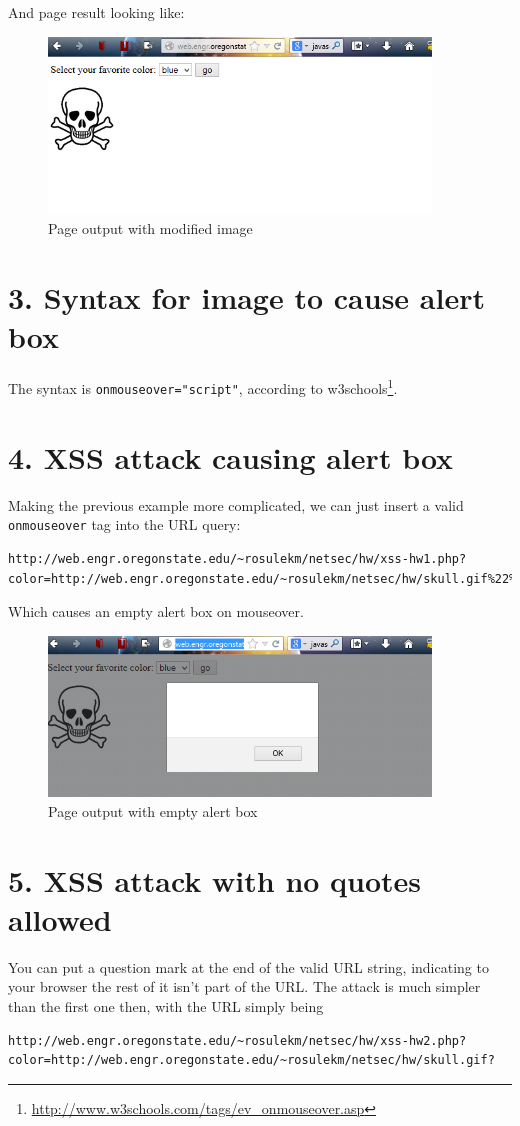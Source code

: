 \documentclass[12pt,letterpaper]{article}
\begin{document}
And page result looking like:
\begin{figure}[H]
\centering
\includegraphics[width=4in]{output1.png}
\caption{Page output with modified image}
\end{figure}

\section*{3. Syntax for image to cause alert box}
The syntax is \verb~onmouseover="script"~, according to w3schools\footnote{\url{http://www.w3schools.com/tags/ev_onmouseover.asp}}.

\section*{4. XSS attack causing alert box}
Making the previous example more complicated, we can just insert a valid
\verb~onmouseover~ tag into the URL query:
\begin{verbatim}
http://web.engr.oregonstate.edu/~rosulekm/netsec/hw/xss-hw1.php?color=http://web.engr.oregonstate.edu/~rosulekm/netsec/hw/skull.gif%22%20onmouseover=alert%28%29%20id=%22bad_image
\end{verbatim}

Which causes an empty alert box on mouseover.
\begin{figure}[H]
\centering
\includegraphics[width=4in]{output2.png}
\caption{Page output with empty alert box}
\end{figure}

\section*{5. XSS attack with no quotes allowed}
You can put a question mark at the end of the valid URL string, indicating
to your browser the rest of it isn't part of the URL. The attack is much
simpler than the first one then, with the URL simply being
\begin{verbatim}
http://web.engr.oregonstate.edu/~rosulekm/netsec/hw/xss-hw2.php?
color=http://web.engr.oregonstate.edu/~rosulekm/netsec/hw/skull.gif?
\end{verbatim}
\end{document}
